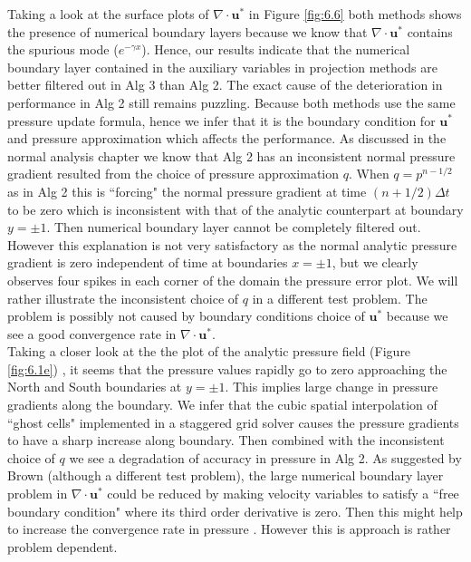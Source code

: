 Taking a look at the surface plots of $\nabla \cdot \textbf{u}^*$ in Figure \ref{fig:6.6} both methods shows the presence of numerical boundary layers because we know that $\nabla \cdot \textbf{u}^*$ contains the spurious mode ($e^{-\gamma x}$). Hence, our results indicate that the numerical boundary layer contained in the auxiliary variables in projection methods are better filtered out in Alg 3 than Alg 2. The exact cause of the deterioration in performance in Alg 2 still remains puzzling. Because both methods use the same pressure update formula, hence we infer that it is the boundary condition for $\textbf{u} ^*$ and pressure approximation which affects the performance. As discussed in the normal analysis chapter we know that Alg 2 has an inconsistent normal pressure gradient resulted from the choice of pressure approximation $q$. When $q = p^{n-1/2}$ as in Alg 2 this is ``forcing" the normal pressure gradient at time $(n+1/2)\Delta t$ to be zero which is inconsistent with that of the analytic counterpart at boundary $y = \pm 1$. Then numerical boundary layer cannot be completely filtered out. However this explanation is not very satisfactory as the normal analytic pressure gradient is zero independent of time at boundaries $x = \pm 1$, but we clearly observes four spikes in each corner of the domain the pressure error plot. We will rather illustrate the inconsistent choice of $q$ in a different test problem. The problem is possibly not caused by boundary conditions choice of $\textbf{u}^*$ because we see a good convergence rate in $\nabla \cdot\textbf{u}^*$. \\

Taking a closer look at the the plot of the analytic pressure field (Figure \ref{fig:6.1e}) , it seems that the pressure values rapidly go to zero approaching the North and South boundaries at $y=\pm 1$. This implies large change in pressure gradients along the boundary. We infer that the cubic spatial interpolation of ``ghost cells" implemented in a staggered grid solver causes the pressure gradients to have a sharp increase along boundary. Then combined with the inconsistent choice of $q$ we see a degradation of accuracy in pressure in Alg 2. As suggested by Brown (although a different test problem), the large numerical boundary layer problem in $\nabla \cdot\textbf{u}^*$ could be reduced by making velocity variables to satisfy a ``free boundary condition" where its third order derivative is zero. Then this might help to increase the convergence rate in pressure \cite{brown2001accurate}. However this is approach is rather problem dependent.\\

